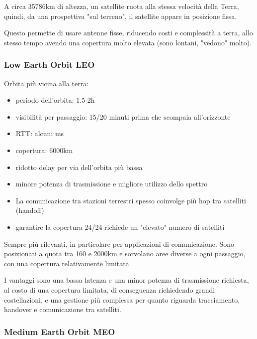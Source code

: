 A circa 35786km di altezza, un satellite ruota alla stessa velocità della Terra, quindi, da una prospettiva "sul terreno", il satellite appare in posizione fissa. 

Questo permette di usare antenne fisse, riducendo costi e complessità a terra, allo stesso tempo avendo una copertura molto elevata (sono lontani, "vedono" molto).

\subsubsection{Low Earth Orbit LEO}

Orbita più vicina alla terra: 
\begin{itemize}
	\item periodo dell'orbita: 1.5-2h

	\item visibilità per passaggio: 15/20 minuti prima che scompaia all'orizzonte

	\item RTT: alcuni ms

	\item copertura: 6000km

	\item ridotto delay per via dell'orbita più bassa

	\item minore potenza di trasmissione e migliore utilizzo dello spettro

	\item La comunicazione tra stazioni terrestri spesso coinvolge più hop tra satelliti (handoff)

	\item garantire la copertura 24/24 richiede un "elevato" numero di satelliti
\end{itemize}

Sempre più rilevanti, in particolare per applicazioni di comunicazione. Sono posizionati a quota tra 160 e 2000km e sorvolano aree diverse a ogni passaggio, con una copertura relativamente limitata. 

I vantaggi sono una bassa latenza e una minor potenza di trasmissione richiesta, al costo di una copertura limitata, di conseguenza richiedendo grandi costellazioni, e una gestione più complessa per quanto riguarda tracciamento, handover e comunicazione tra satelliti.

\subsubsection{Medium Earth Orbit MEO}

